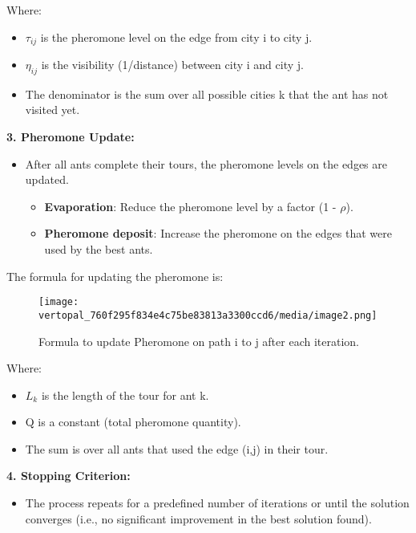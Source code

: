 \documentclass[
]{article}
\begin{document}
Where:

\begin{itemize}
\item
  $\tau_{ij}$\hspace{0pt} is the pheromone level on the edge from city i to city
  j.
\item
  $\eta_{ij}$\hspace{0pt} is the visibility (1/distance) between city i and city
  j.
\item
  The denominator is the sum over all possible cities k that the ant
  has not visited yet.
\end{itemize}

\textbf{3. Pheromone Update:}

\begin{itemize}
\item
  After all ants complete their tours, the pheromone levels on the edges
  are updated.

  \begin{itemize}
  \item
    \textbf{Evaporation}: Reduce the pheromone level by a factor (1 - $\rho$).
  \item
    \textbf{Pheromone deposit}: Increase the pheromone on the edges that
    were used by the best ants.
  \end{itemize}
\end{itemize}

The formula for updating the pheromone is:

\begin{figure}[htbp]
\centering
\texttt{[image: vertopal\_760f295f834e4c75be83813a3300ccd6/media/image2.png]}
\caption{Formula to update Pheromone on path i to j after each iteration. {\label{fig:my_label}}}
\end{figure}

Where:

\begin{itemize}
\item
  $L_{k}$ is the length of the tour for ant k.
\item
  Q is a constant (total pheromone quantity).
\item
  The sum is over all ants that used the edge (i,j) in their tour.
\end{itemize}

\textbf{4. Stopping Criterion:}

\begin{itemize}
\item
  The process repeats for a predefined number of iterations or until the
  solution converges (i.e., no significant improvement in the best
  solution found).
\end{itemize}
\end{document}

